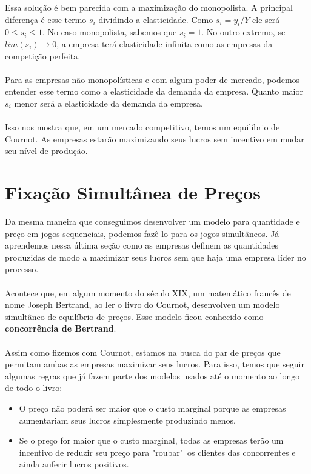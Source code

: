 \documentclass[a4paper,11pt,oneside]{book}
\theoremstyle{definition}
\theoremstyle{break}
\begin{document}
Essa solução é bem parecida com a maximização do monopolista. A principal diferença é esse termo $s_i$ dividindo a elasticidade. Como $s_i = y_i/Y$ ele será $0 \leq s_i \leq 1$. No caso monopolista, sabemos que $s_i = 1$. No outro extremo, se $lim (s_i) \rightarrow 0$, a empresa terá elasticidade infinita como as empresas da competição perfeita.  
\\~\\
Para as empresas não monopolísticas e com algum poder de mercado, podemos entender esse termo como a elasticidade da demanda da empresa. Quanto maior $s_i$ menor será a elasticidade da demanda da empresa.
\\~\\
Isso nos mostra que, em um mercado competitivo, temos um equilíbrio de Cournot. As empresas estarão maximizando seus lucros sem incentivo em mudar seu nível de produção.

\section{Fixação Simultânea de Preços}

Da mesma maneira que conseguimos desenvolver um modelo para quantidade e preço em jogos sequenciais, podemos fazê-lo para os jogos simultâneos. Já aprendemos nessa última seção como as empresas definem as quantidades produzidas de modo a maximizar seus lucros sem que haja uma empresa líder no processo.
\\~\\
Acontece que, em algum momento do século XIX, um matemático francês de nome Joseph Bertrand, ao ler o livro do Cournot, desenvolveu um modelo simultâneo de equilíbrio de preços. Esse modelo ficou conhecido como \textbf{concorrência de Bertrand}.
\\~\\
Assim como fizemos com Cournot, estamos na busca do par de preços que permitam ambas as empresas maximizar seus lucros. Para isso, temos que seguir algumas regras que já fazem parte dos modelos usados até o momento ao longo de todo o livro:

\begin{itemize}
	\item O preço não poderá ser maior que o custo marginal porque as empresas aumentariam seus lucros simplesmente produzindo menos.
	\item Se o preço for maior que o custo marginal, todas as empresas terão um incentivo de reduzir seu preço para "roubar"\ os clientes das concorrentes e ainda auferir lucros positivos.
\end{itemize}
\end{document}
